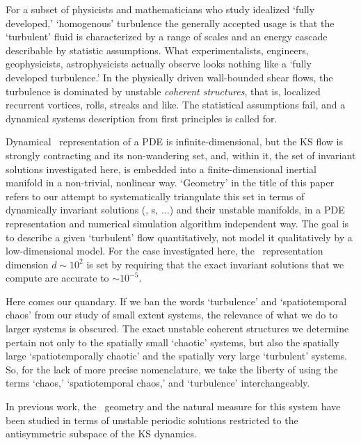 For a subset of physicists and mathematicians who study
idealized `fully developed,' `homogenous' turbulence the
generally accepted usage is that the `turbulent' fluid is
characterized by a range of scales and an energy cascade
describable by statistic assumptions. What experimentalists,
engineers, geophysicists, astrophysicists actually observe
looks nothing like a `fully developed turbulence.' In the
physically driven wall-bounded shear flows, the turbulence is
dominated by unstable \emph{coherent structures}, that is,
localized recurrent vortices, rolls, streaks and like. The
statistical assumptions fail, and a dynamical systems
description from first principles is called for.


Dynamical \statesp\ representation of a PDE is
infinite-dimensional, but the KS flow is strongly contracting
and its non-wandering set, and, within it, the set of
invariant solutions investigated here, is embedded into a
finite-dimensional inertial manifold in a
non-trivial, nonlinear way. `Geometry' in the title of this
paper refers to our attempt to systematically triangulate
this set in terms of dynamically invariant solutions (\eqva,
\po s, $\ldots$) and their unstable manifolds, in a PDE
representation and numerical simulation algorithm independent
way. The goal is to describe a given `turbulent' flow
quantitatively, not model it qualitatively by a
low-dimensional model. For the case investigated here, the
\statesp\ representation dimension $d \sim 10^2$ is set by
requiring that the exact invariant solutions that we compute
are accurate to $\sim 10^{-5}$.

Here comes our quandary. If we ban the words `turbulence' and
`spatiotemporal chaos' from our study of small extent
systems, the relevance of what we do to larger systems is
obscured. The exact unstable coherent structures we determine
pertain not only to the spatially small `chaotic' systems,
but also the spatially large `spatiotemporally chaotic' and
the spatially very large `turbulent' systems.
So, for the lack of more precise nomenclature, we take the
liberty of using the terms `chaos,' `spatiotemporal chaos,'
and `turbulence' interchangeably.


In previous work, the \statesp\ geometry and the natural measure for
this system have been
studied in terms of unstable
periodic solutions restricted to the antisymmetric subspace of the
KS dynamics.

